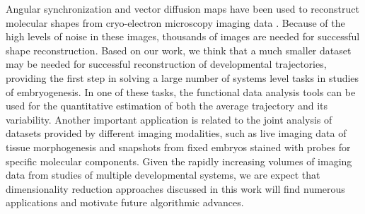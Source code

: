 \documentclass{pnastwo}
\begin{document}
\begin{article}
Angular synchronization and vector diffusion maps have been used to reconstruct molecular shapes from cryo-electron microscopy imaging data \cite{singer2012vector}. 
%
Because of the high levels of noise in these images, thousands of images are needed for successful shape reconstruction. 
%
Based on our work, we think that a much smaller dataset may be needed for successful reconstruction of developmental trajectories, providing the first step in solving a large number of systems level tasks in studies of embryogenesis. 
%
In one of these tasks, the functional data analysis tools can be used for the quantitative estimation of both the average trajectory and its variability.  
%
Another important application is related to the joint analysis of datasets provided by different imaging modalities, such as live imaging data of tissue morphogenesis and snapshots from fixed embryos stained with probes for specific molecular components.
%
Given the rapidly increasing volumes of imaging data from studies of multiple developmental systems, we are expect that dimensionality reduction approaches discussed in this work will find numerous applications and motivate future algorithmic advances. 
  



\end{article}
\end{document}
